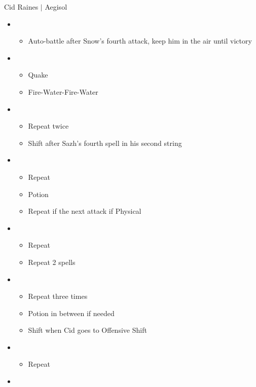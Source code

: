 \begin{battle}{Cid Raines $|$ Aegisol}
\begin{multicols}{2}
\begin{itemize}
\begin{itemize}
\begin{itemize}
        \end{itemize}
    \end{itemize}
    \item \sixth
    \begin{itemize}
        \item Auto-battle after Snow's fourth attack, keep him in the air until victory
    \end{itemize}
\end{itemize}
\columnbreak
\begin{itemize}
    \item \first
    \begin{itemize}
        \item Quake
        \item Fire-Water-Fire-Water
    \end{itemize}
    \item \third
    \begin{itemize}
        \item Repeat twice
        \item Shift after Sazh's fourth spell in his second string
    \end{itemize}
    \item \fourth
    \begin{itemize}
        \item Repeat
        \item Potion
        \item Repeat if the next attack if Physical
    \end{itemize}
    \item \fifth
    \begin{itemize}
        \item Repeat
        \item Repeat 2 spells
    \end{itemize}
    \item \second
    \begin{itemize}
        \item Repeat three times
        \item Potion in between if needed
        \item Shift when Cid goes to Offensive Shift
    \end{itemize}
    \item \third
    \begin{itemize}
        \item Repeat
    \end{itemize}
    \item \second

\end{itemize}
\end{multicols}
\end{battle}
